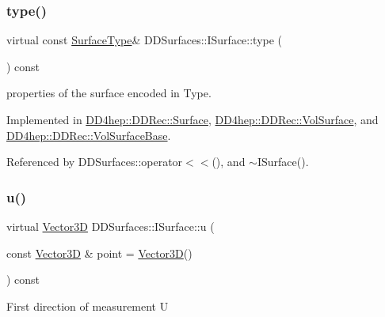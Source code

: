 \subsubsection{\texorpdfstring{type()}{type()}}
{\footnotesize\ttfamily virtual const \hyperlink{class_d_d_surfaces_1_1_surface_type}{Surface\+Type}\& D\+D\+Surfaces\+::\+I\+Surface\+::type (\begin{DoxyParamCaption}{ }\end{DoxyParamCaption}) const\hspace{0.3cm}{\ttfamily [pure virtual]}}



properties of the surface encoded in Type. 



Implemented in \hyperlink{class_d_d4hep_1_1_d_d_rec_1_1_surface_a28bdf868a99ad7cdde62cb1b4309173d}{D\+D4hep\+::\+D\+D\+Rec\+::\+Surface}, \hyperlink{class_d_d4hep_1_1_d_d_rec_1_1_vol_surface_a7a08c8fe2dcd9c0e0fe24f1400f29789}{D\+D4hep\+::\+D\+D\+Rec\+::\+Vol\+Surface}, and \hyperlink{class_d_d4hep_1_1_d_d_rec_1_1_vol_surface_base_aa59d5b3c519424448db12c015a95b760}{D\+D4hep\+::\+D\+D\+Rec\+::\+Vol\+Surface\+Base}.



Referenced by D\+D\+Surfaces\+::operator$<$$<$(), and $\sim$\+I\+Surface().

\hypertarget{class_d_d_surfaces_1_1_i_surface_a09fd4aa43cc96d50b4b81b94107f7d8f}{}\label{class_d_d_surfaces_1_1_i_surface_a09fd4aa43cc96d50b4b81b94107f7d8f} 
\subsubsection{\texorpdfstring{u()}{u()}}
{\footnotesize\ttfamily virtual \hyperlink{class_d_d_surfaces_1_1_vector3_d}{Vector3D} D\+D\+Surfaces\+::\+I\+Surface\+::u (\begin{DoxyParamCaption}\item[{const \hyperlink{class_d_d_surfaces_1_1_vector3_d}{Vector3D} \&}]{point = {\ttfamily \hyperlink{class_d_d_surfaces_1_1_vector3_d}{Vector3D}()} }\end{DoxyParamCaption}) const\hspace{0.3cm}{\ttfamily [pure virtual]}}

First direction of measurement U 

